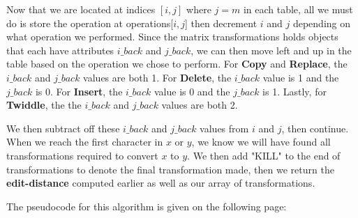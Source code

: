 \documentclass[11pt]{article}
\begin{document}
Now that we are located at indices $[i,j]$ where $j=m$ in each table, all we must do is store the operation at operations[$i,j$] then decrement $i$ and $j$ depending on what operation we performed. Since the matrix transformations holds objects that each have attributes $i\_back$ and $j\_back$, we can then move left and up in the table based on the operation we chose to perform. For \textbf{Copy} and \textbf{Replace}, the $i\_back$ and $j\_back$ values are both 1. For \textbf{Delete}, the $i\_back$ value is 1 and the $j\_back$ is 0. For \textbf{Insert}, the $i\_back$ value is 0 and the $j\_back$ is 1. Lastly, for \textbf{Twiddle}, the the $i\_back$ and $j\_back$ values are both 2.

We then subtract off these $i\_back$ and $j\_back$ values from $i$ and $j$, then continue. When we reach the first character in $x$ or $y$, we know we will have found all transformations required to convert $x$ to $y$. We then add "KILL" to the end of transformations to denote the final transformation made, then we return the \textbf{edit-distance} computed earlier as well as our array of transformations.

The pseudocode for this algorithm is given on the following page:
\end{document}
